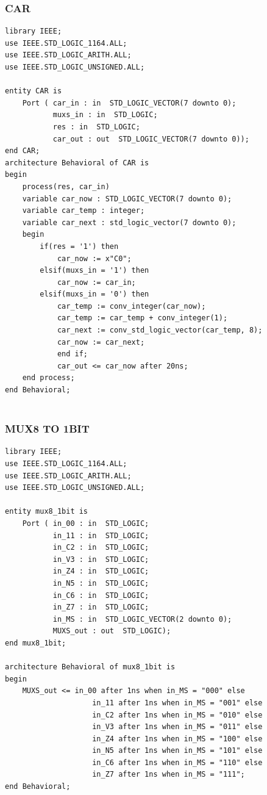 \documentclass{article}
\begin{document}
\subsubsection{CAR}\label{sec:intro}

\begin{lstlisting}
library IEEE;
use IEEE.STD_LOGIC_1164.ALL;
use IEEE.STD_LOGIC_ARITH.ALL;
use IEEE.STD_LOGIC_UNSIGNED.ALL;

entity CAR is
    Port ( car_in : in  STD_LOGIC_VECTOR(7 downto 0);
           muxs_in : in  STD_LOGIC;
           res : in  STD_LOGIC;
           car_out : out  STD_LOGIC_VECTOR(7 downto 0));
end CAR;
architecture Behavioral of CAR is
begin
	process(res, car_in)
	variable car_now : STD_LOGIC_VECTOR(7 downto 0);
	variable car_temp : integer;
	variable car_next : std_logic_vector(7 downto 0);
	begin
		if(res = '1') then
			car_now := x"C0";
		elsif(muxs_in = '1') then 
			car_now := car_in;
		elsif(muxs_in = '0') then 
			car_temp := conv_integer(car_now);
			car_temp := car_temp + conv_integer(1);
			car_next := conv_std_logic_vector(car_temp, 8);
			car_now := car_next;
			end if;
			car_out <= car_now after 20ns;
	end process;
end Behavioral;
   
\end{lstlisting}
\pagebreak


\subsubsection{MUX8 TO 1BIT}\label{sec:intro}

\begin{lstlisting}
library IEEE;
use IEEE.STD_LOGIC_1164.ALL;
use IEEE.STD_LOGIC_ARITH.ALL;
use IEEE.STD_LOGIC_UNSIGNED.ALL;

entity mux8_1bit is
    Port ( in_00 : in  STD_LOGIC;
           in_11 : in  STD_LOGIC;
           in_C2 : in  STD_LOGIC;
           in_V3 : in  STD_LOGIC;
           in_Z4 : in  STD_LOGIC;
           in_N5 : in  STD_LOGIC;
           in_C6 : in  STD_LOGIC;
           in_Z7 : in  STD_LOGIC;
           in_MS : in  STD_LOGIC_VECTOR(2 downto 0);
           MUXS_out : out  STD_LOGIC);
end mux8_1bit;

architecture Behavioral of mux8_1bit is
begin
	MUXS_out <= in_00 after 1ns when in_MS = "000" else
					in_11 after 1ns when in_MS = "001" else 
					in_C2 after 1ns when in_MS = "010" else
					in_V3 after 1ns when in_MS = "011" else
					in_Z4 after 1ns when in_MS = "100" else 
					in_N5 after 1ns when in_MS = "101" else
					in_C6 after 1ns when in_MS = "110" else
					in_Z7 after 1ns when in_MS = "111";
end Behavioral;
   
\end{lstlisting}
\pagebreak
\end{document}

